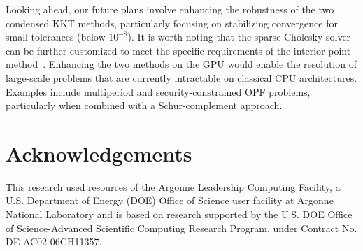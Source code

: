 \documentclass[smallextended]{svjour3}
\begin{document}
Looking ahead, our future plans involve enhancing the robustness of the two condensed KKT methods, particularly focusing on stabilizing convergence for small tolerances (below $10^{-8}$).
It is worth noting that the sparse Cholesky solver can be further customized to meet the specific requirements of the interior-point method~\cite{wright1999modified}.
Enhancing the two methods on the GPU would enable the resolution of large-scale problems that are currently intractable on classical CPU architectures.
Examples include multiperiod and security-constrained OPF problems, particularly when combined with a Schur-complement approach.

\small


\normalsize
\section{Acknowledgements}
This research used resources of the Argonne Leadership Computing Facility, a U.S. Department of Energy (DOE) Office of Science user facility at Argonne National Laboratory and is based on research supported by the U.S. DOE Office of Science-Advanced Scientific Computing Research Program, under Contract No. DE-AC02-06CH11357. 
\end{document}

